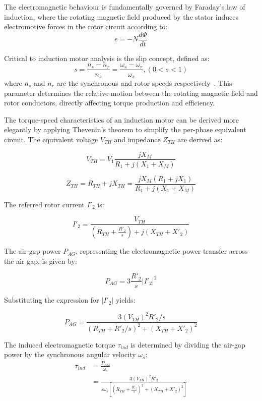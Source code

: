 \documentclass[a4paper,11pt]{IEEEtran}
\begin{document}
The electromagnetic behaviour is fundamentally governed by Faraday's law of induction, where the rotating magnetic field produced by the stator induces electromotive forces in the rotor circuit according to:
\begin{equation}
e = -N\frac{d\Phi}{dt}
\end{equation}

Critical to induction motor analysis is the slip concept, defined as:
\begin{equation}
s = \frac{n_s - n_r}{n_s} = \frac{\omega_s - \omega_r}{\omega_s}, (0<s<1)
\end{equation}
where $n_s$ and $n_r$ are the synchronous and rotor speeds respectively~\cite{ong1998}. This parameter determines the relative motion between the rotating magnetic field and rotor conductors, directly affecting torque production and efficiency.

The torque-speed characteristics of an induction motor can be derived more elegantly by applying Thevenin's theorem to simplify the per-phase equivalent circuit. The equivalent voltage $V_{TH}$ and impedance $Z_{TH}$ are derived as:

\begin{equation}
V_{TH} = V_1 \frac{jX_M}{R_1 + j(X_1 + X_M)}
\end{equation}

\begin{equation}
Z_{TH}=R_{TH}+jX_{TH} = \frac{jX_M(R_1 + jX_1)}{R_1 + j(X_1 + X_M)}
\end{equation}

The referred rotor current $I'_2$ is:

\begin{equation}
I'_2 = \frac{V_{TH}}{\left(R_{TH} + \frac{R'_2}{s}\right) + j(X_{TH} + X'_2)}
\end{equation}

The air-gap power $P_{AG}$, representing the electromagnetic power transfer across the air gap, is given by:

\begin{equation}
P_{AG} = 3 \frac{R'_2}{s} |I'_2|^2
\end{equation}

Substituting the expression for $|I'_2|$ yields:

\begin{equation}
P_{AG} = \frac{3(V_{TH})^2 R'_2/s}{(R_{TH} + R'_2/s)^2 + (X_{TH} + X'_2)^2}
\end{equation}

The induced electromagnetic torque $\tau_{ind}$ is determined by dividing the air-gap power by the synchronous angular velocity $\omega_s$:
\begin{align}
\tau_{ind} &= \frac{P_{AG}}{\omega_s} \nonumber\\
           &= \frac{3(V_{TH})^2 R'_2}{s\omega_s \left[\left(R_{TH} + \frac{R'_2}{s}\right)^2 + (X_{TH} + X'_2)^2\right]}
\end{align}
\end{document}
